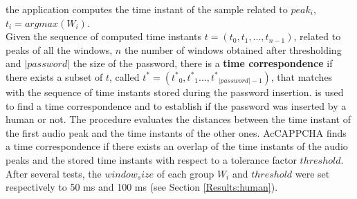 the application computes the time instant of the sample related to $peak_i$, $t_i= argmax(W_i)$.\\
Given the sequence of computed time instants $t=(t_0, t_1, ..., t_{n-1})$, related to peaks of all the windows, $n$ the number of windows obtained after thresholding and $|password|$ the size of the password, there is a \textbf{time correspondence} if there exists a subset of $t$, called $t^{*}=({t^*}_0, {t^*}_1..., {t^*}_{|password|-1})$, that matches with the sequence of time instants stored during the password insertion.  is used to find a time correspondence and to establish if the password was inserted by a human or not. The procedure evaluates the distances between the time instant of the first audio peak and the time instants of the other ones. AcCAPPCHA finds a time correspondence if there exists an overlap of the time instants of the audio peaks and the stored time instants with respect to a tolerance factor $threshold$. After several tests, the $window_size$ of each group $W_i$ and $threshold$ were set respectively to 50 ms and 100 ms (see Section \ref{Results:human}).\\ 
